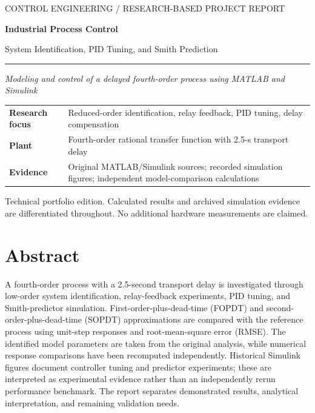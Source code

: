 \documentclass[11pt,a4paper]{article}
\begin{document}
\thispagestyle{empty}
\vspace*{28mm}
{\sffamily\large\color{slate} CONTROL ENGINEERING \quad / \quad RESEARCH-BASED PROJECT REPORT\par}
\vspace{8mm}
{\fontsize{28}{33}\selectfont\bfseries Industrial Process Control\par}
\vspace{3mm}
{\fontsize{18}{23}\selectfont System Identification, PID Tuning, and Smith Prediction\par}
\vspace{11mm}
\noindent\rule{\linewidth}{.8pt}
\vspace{8mm}
{\large\itshape Modeling and control of a delayed fourth-order process using MATLAB and Simulink\par}
\vspace{10mm}
\begin{tabularx}{\linewidth}{@{}>{\bfseries}p{39mm}X@{}}
Research focus & Reduced-order identification, relay feedback, PID tuning, delay compensation\\[5pt]
Plant & Fourth-order rational transfer function with 2.5-s transport delay\\[5pt]
Evidence & Original MATLAB/Simulink sources; recorded simulation figures; independent model-comparison calculations\\
\end{tabularx}
\vfill
{\footnotesize\color{slate} Technical portfolio edition. Calculated results and archived simulation evidence are differentiated throughout. No additional hardware measurements are claimed.\par}
\clearpage
\section*{Abstract}
A fourth-order process with a 2.5-second transport delay is investigated through low-order system identification, relay-feedback experiments, PID tuning, and Smith-predictor simulation. First-order-plus-dead-time (FOPDT) and second-order-plus-dead-time (SOPDT) approximations are compared with the reference process using unit-step responses and root-mean-square error (RMSE). The identified model parameters are taken from the original analysis, while numerical response comparisons have been recomputed independently. Historical Simulink figures document controller tuning and predictor experiments; these are interpreted as experimental evidence rather than an independently rerun performance benchmark. The report separates demonstrated results, analytical interpretation, and remaining validation needs.
\end{document}
